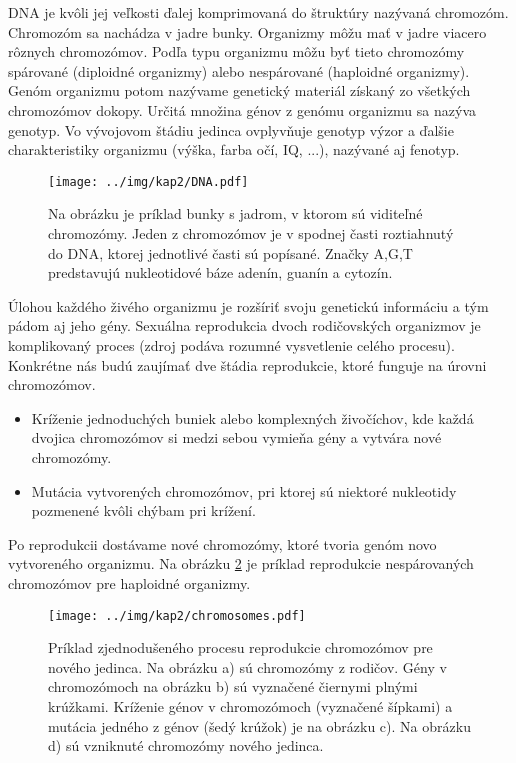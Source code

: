 DNA je kvôli jej veľkosti ďalej komprimovaná do štruktúry nazývaná chromozóm. Chromozóm sa nachádza v jadre bunky. Organizmy môžu mať v jadre viacero rôznych chromozómov. Podľa typu organizmu môžu byť tieto chromozómy spárované (diploidné organizmy) alebo nespárované (haploidné organizmy). Genóm organizmu potom nazývame genetický materiál získaný zo všetkých chromozómov dokopy. Určitá množina génov z genómu organizmu sa nazýva genotyp. Vo vývojovom štádiu jedinca ovplyvňuje genotyp výzor a ďalšie charakteristiky organizmu (výška, farba očí, IQ, ...), nazývané aj fenotyp.

\begin{figure}[h]
\centering
\centerline{\mbox{\texttt{[image: ../img/kap2/DNA.pdf]}}}
\caption{Na obrázku je príklad bunky s jadrom, v ktorom sú viditeľné chromozómy. Jeden z chromozómov je v spodnej časti roztiahnutý do DNA, ktorej jednotlivé časti sú popísané. Značky A,G,T predstavujú nukleotidové báze adenín, guanín a cytozín.}\label{fig:DNA}
\end{figure}

Úlohou každého živého organizmu je rozšíriť svoju genetickú informáciu a tým pádom aj jeho gény. Sexuálna reprodukcia dvoch rodičovských organizmov je komplikovaný proces (zdroj \cite{online-shuffling} podáva rozumné vysvetlenie celého procesu). Konkrétne nás budú zaujímať dve štádia reprodukcie, ktoré funguje na úrovni chromozómov.
\begin{itemize}
\item Kríženie jednoduchých buniek alebo komplexných živočíchov, kde každá dvojica chromozómov si medzi sebou vymieňa gény a vytvára nové chromozómy.
\item Mutácia vytvorených chromozómov, pri ktorej sú niektoré nukleotidy pozmenené kvôli chýbam pri krížení.
\end{itemize}
Po reprodukcii dostávame nové chromozómy, ktoré tvoria genóm novo vytvoreného organizmu. Na obrázku \ref{fig:Chromosomes} je príklad reprodukcie nespárovaných chromozómov pre haploidné organizmy.

\begin{figure}[h]
\centering
\centerline{\mbox{\texttt{[image: ../img/kap2/chromosomes.pdf]}}}
\caption{Príklad zjednodušeného procesu reprodukcie chromozómov pre nového jedinca. Na obrázku a) sú chromozómy z rodičov. Gény v chromozómoch na obrázku b) sú vyznačené čiernymi plnými krúžkami. Kríženie génov v chromozómoch (vyznačené šípkami) a mutácia jedného z génov (šedý krúžok) je na obrázku c). Na obrázku d) sú vzniknuté chromozómy nového jedinca.}\label{fig:Chromosomes}
\end{figure}

